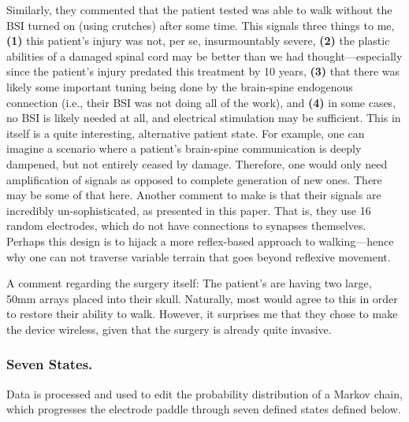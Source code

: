 Similarly, they commented that the patient tested was able to walk without the BSI turned on (using crutches) after some time. This signals three things to me, \textbf{(1)} this patient's injury was not, per se, insurmountably severe, \textbf{(2)} the plastic abilities of a damaged spinal cord may be better than we had thought---especially since the patient's injury predated this treatment by 10 years, \textbf{(3)} that there was likely some important tuning being done by the brain-spine endogenous connection (i.e., their BSI was not doing all of the work), and \textbf{(4)} in some cases, no BSI is likely needed at all, and electrical stimulation may be sufficient. This in itself is a quite interesting, alternative patient state. For example, one can imagine a scenario where a patient's brain-spine communication is deeply dampened, but not entirely ceased by damage. Therefore, one would only need amplification of signals as opposed to complete generation of new ones. There may be some of that here. Another comment to make is that their signals are incredibly un-sophisticated, as presented in this paper. That is, they use 16 random electrodes, which do not have connections to synapses themselves. Perhaps this design is to hijack a more reflex-based approach to walking---hence why one can not traverse variable terrain that goes beyond reflexive movement.\newline

A comment regarding the surgery itself: The patient's are having two large, 50mm arrays placed into their skull. Naturally, most would agree to this in order to restore their ability to walk. However, it surprises me that they chose to make the device wireless, given that the surgery is already quite invasive. 

\subsubsection{Seven States.} 

Data is processed and used to edit the probability distribution of a Markov chain, which progresses the electrode paddle through seven defined states defined below.

